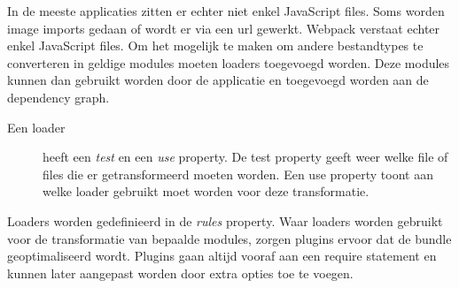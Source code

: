 In de meeste applicaties zitten er echter niet enkel JavaScript files. Soms worden image imports gedaan of wordt er via een url gewerkt. Webpack verstaat echter enkel JavaScript files. Om het mogelijk te maken om andere bestandtypes te converteren in geldige modules moeten loaders toegevoegd worden. Deze modules kunnen dan gebruikt worden door de applicatie en toegevoegd worden aan de dependency graph. 

\begin{description}
	\item[Een loader] heeft een \textit{test} en een \textit{use} property. De test property geeft weer welke file of files die er getransformeerd moeten worden. Een use property toont aan welke loader gebruikt moet worden voor deze transformatie.
\end{description}

Loaders worden gedefinieerd in de \textit{rules} property.
Waar loaders worden gebruikt voor de transformatie van bepaalde modules, zorgen plugins ervoor dat de bundle geoptimaliseerd wordt. Plugins gaan altijd vooraf aan een require statement en kunnen later aangepast worden door extra opties toe te voegen. 

